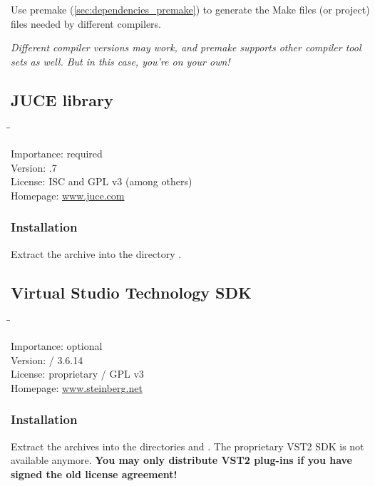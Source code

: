 Use premake (\ref{sec:dependencies_premake}) to generate the Make
files (or project) files needed by different compilers.

\emph{Different compiler versions may work, and premake supports other
  compiler tool sets as well.  But in this case, you're on your own!}

\subsection{JUCE library}

\begin{tabbing}
  \hspace*{6em}\=\=\kill

  Importance:  \> required \\
  Version:     .7 \\
  License:     \> ISC and GPL v3 (among others) \\
  Homepage:    \> \href{http://www.juce.com/}{www.juce.com}
\end{tabbing}

\subsubsection{Installation}

Extract the archive into the directory .

\subsection{Virtual Studio Technology SDK}

\begin{tabbing}
  \hspace*{6em}\=\=\kill

  Importance:  \> optional \\
  Version:      / 3.6.14 \\
  License:     \> proprietary / GPL v3 \\
  Homepage:    \> \href{http://www.steinberg.net/en/company/developer.html}{www.steinberg.net}
\end{tabbing}

\subsubsection{Installation}

Extract the archives into the directories  and
.  The proprietary VST2 SDK is not available
anymore.  \textbf{You may only distribute VST2 plug-ins if you have
  signed the old license agreement!}


